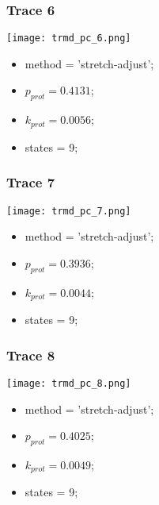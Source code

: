 \subsubsection{Trace 6}
\begin{minipage}[c]{0.7\textwidth}
	\texttt{[image: trmd\_pc\_6.png]}
\end{minipage}
\hfill
\begin{minipage}[c]{0.45\textwidth}
	\begin{itemize}
		\item method = 'stretch-adjust';
		\item $p_{prot}=0.4131$;
		\item $k_{prot}=0.0056$;
		\item states = 9;
	\end{itemize}
\end{minipage}

\subsubsection{Trace 7}
\begin{minipage}[c]{0.7\textwidth}
	\texttt{[image: trmd\_pc\_7.png]}
\end{minipage}
\hfill
\begin{minipage}[c]{0.45\textwidth}
	\begin{itemize}
		\item method = 'stretch-adjust';
		\item $p_{prot}=0.3936$;
		\item $k_{prot}=0.0044$;
		\item states = 9;
	\end{itemize}
\end{minipage}

\subsubsection{Trace 8}
\begin{minipage}[c]{0.7\textwidth}
	\texttt{[image: trmd\_pc\_8.png]}
\end{minipage}
\hfill
\begin{minipage}[c]{0.45\textwidth}
	\begin{itemize}
		\item method = 'stretch-adjust';
		\item $p_{prot}=0.4025$;
		\item $k_{prot}=0.0049$;
		\item states = 9;
	\end{itemize}
\end{minipage}

